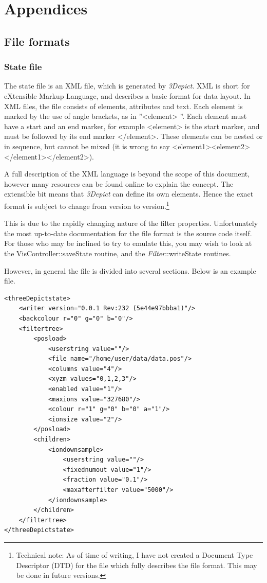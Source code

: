 \documentclass[10pt]{article}
\begin{document}
\section{Appendices}

\subsection{File formats}

\subsubsection{State file}
\label{sec:xmlstatefile}
The state file is an XML file, which is generated by \emph{3Depict}. XML is short for eXtensible Markup Language, and describes  a basic format for data layout. In XML files, the file consists of elements, attributes and text. Each element is marked by the use of angle brackets, as in ''<element> ''. Each element must have a start and an end marker, for example <element> is the start marker, and must be followed by its end marker </element>. These elements can be nested or in sequence, but cannot be mixed (it is wrong to say <element1><element2></element1></element2>). 

A full description of the XML language is beyond the scope of this document, however many resources can be found online to explain the concept. The extensible bit means that \emph{3Depict} can define its own elements. Hence the exact format is subject to change from version to version.\footnote{Technical note: As of time of writing, I have not created a Document Type Descriptor (DTD) for the file which fully describes the file format. This may be done in future versions.}

This is due to the rapidly changing nature of the filter properties. Unfortunately the most up-to-date documentation for the file format is the source code itself. For those who may be inclined to try to emulate this, you may wish to look at the VisController::saveState routine, and the \emph{Filter}::writeState routines.

However, in general the file is divided into several sections. Below is an example file.
\begin{verbatim}
<threeDepictstate>
    <writer version="0.0.1 Rev:232 (5e44e97bbba1)"/>
    <backcolour r="0" g="0" b="0"/>
    <filtertree>
        <posload>
            <userstring value=""/>
            <file name="/home/user/data/data.pos"/>
            <columns value="4"/>
            <xyzm values="0,1,2,3"/>
            <enabled value="1"/>
            <maxions value="327680"/>
            <colour r="1" g="0" b="0" a="1"/>
            <ionsize value="2"/>
        </posload>
        <children>
            <iondownsample>
                <userstring value=""/>
                <fixednumout value="1"/>
                <fraction value="0.1"/>
                <maxafterfilter value="5000"/>
            </iondownsample>
        </children>
    </filtertree>
</threeDepictstate>
\end{verbatim}
\end{document}
